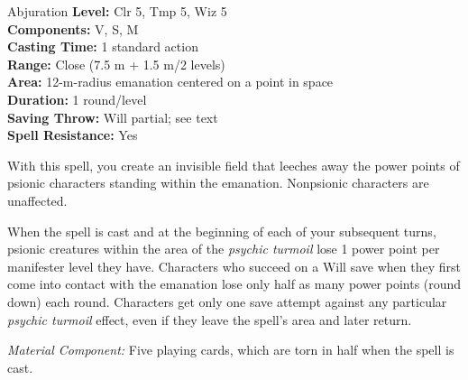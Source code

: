 {Abjuration}
{
	\textbf{Level:} Clr 5, Tmp 5, Wiz 5\\
	\textbf{Components:} V, S, M\\
	\textbf{Casting Time:} 1 standard action\\
	\textbf{Range:} Close (7.5 m + 1.5 m/2 levels)\\
	\textbf{Area:} 12-m-radius emanation centered on a point in space\\
	\textbf{Duration:} 1 round/level\\
	\textbf{Saving Throw:} Will partial; see text\\
	\textbf{Spell Resistance:} Yes\\
}
{
	With this spell, you create an invisible field that leeches away the power points of psionic characters standing within the emanation. Nonpsionic characters are unaffected.

	When the spell is cast and at the beginning of each of your subsequent turns, psionic creatures within the area of the \emph{psychic turmoil} lose 1 power point per manifester level they have. Characters who succeed on a Will save when they first come into contact with the emanation lose only half as many power points (round down) each round. Characters get only one save attempt against any particular \emph{psychic turmoil} effect, even if they leave the spell's area and later return.

	\textit{Material Component:} Five playing cards, which are torn in half when the spell is cast.
}
